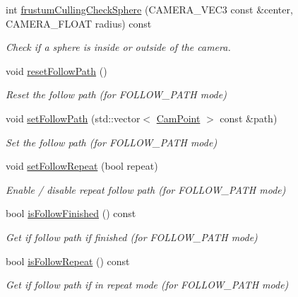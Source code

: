 \begin{DoxyCompactItemize}
int \hyperlink{class_camera_a2be9694e31b56ae806836a81844ad1bb}{frustum\+Culling\+Check\+Sphere} (C\+A\+M\+E\+R\+A\+\_\+\+V\+E\+C3 const \&center, C\+A\+M\+E\+R\+A\+\_\+\+F\+L\+O\+AT radius) const
\begin{DoxyCompactList}\small\item\em Check if a sphere is inside or outside of the camera. \end{DoxyCompactList}\item 
\mbox{\label{class_camera_a510c9f3ecf465578002fdd03dadb3f6d}} 
void \hyperlink{class_camera_a510c9f3ecf465578002fdd03dadb3f6d}{reset\+Follow\+Path} ()
\begin{DoxyCompactList}\small\item\em Reset the follow path (for F\+O\+L\+L\+O\+W\+\_\+\+P\+A\+TH mode) \end{DoxyCompactList}\item 
void \hyperlink{class_camera_a340c9687399742b3c9c1dec3f02d9b32}{set\+Follow\+Path} (std\+::vector$<$ \hyperlink{struct_cam_point}{Cam\+Point} $>$ const \&path)
\begin{DoxyCompactList}\small\item\em Set the follow path (for F\+O\+L\+L\+O\+W\+\_\+\+P\+A\+TH mode) \end{DoxyCompactList}\item 
void \hyperlink{class_camera_a9f190ab490492b811ccc3603b68fe70a}{set\+Follow\+Repeat} (bool repeat)
\begin{DoxyCompactList}\small\item\em Enable / disable repeat follow path (for F\+O\+L\+L\+O\+W\+\_\+\+P\+A\+TH mode) \end{DoxyCompactList}\item 
bool \hyperlink{class_camera_a3e7c256d5df9a0dd554b845e3ece414e}{is\+Follow\+Finished} () const
\begin{DoxyCompactList}\small\item\em Get if follow path if finished (for F\+O\+L\+L\+O\+W\+\_\+\+P\+A\+TH mode) \end{DoxyCompactList}\item 
bool \hyperlink{class_camera_aadea4e3706e4a1405c7b035c60d6d69e}{is\+Follow\+Repeat} () const
\begin{DoxyCompactList}\small\item\em Get if follow path if in repeat mode (for F\+O\+L\+L\+O\+W\+\_\+\+P\+A\+TH mode) \end{DoxyCompactList}\item 

\end{DoxyCompactItemize}
